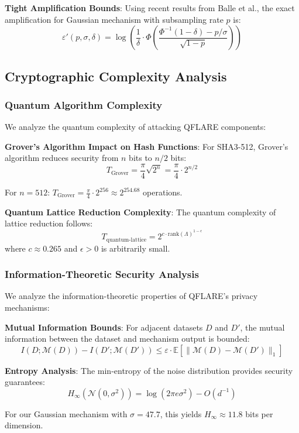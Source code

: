 \documentclass[journal]{IEEEtran}
\begin{document}
\textbf{Tight Amplification Bounds}: Using recent results from Balle et al., the exact amplification for Gaussian mechanism with subsampling rate $p$ is:
$$\varepsilon'(p, \sigma, \delta) = \log\left(\frac{1}{\delta} \cdot \Phi\left(\frac{\Phi^{-1}(1-\delta) - p/\sigma}{\sqrt{1-p}}\right)\right)$$

\subsection{Cryptographic Complexity Analysis}

\subsubsection{Quantum Algorithm Complexity}

We analyze the quantum complexity of attacking QFLARE components:

\textbf{Grover's Algorithm Impact on Hash Functions}:
For SHA3-512, Grover's algorithm reduces security from $n$ bits to $n/2$ bits:
$$T_{\text{Grover}} = \frac{\pi}{4}\sqrt{2^n} = \frac{\pi}{4} \cdot 2^{n/2}$$

For $n = 512$: $T_{\text{Grover}} = \frac{\pi}{4} \cdot 2^{256} \approx 2^{254.68}$ operations.

\textbf{Quantum Lattice Reduction Complexity}:
The quantum complexity of lattice reduction follows:
$$T_{\text{quantum-lattice}} = 2^{c \cdot \text{rank}(\Lambda)^{1-\epsilon}}$$
where $c \approx 0.265$ and $\epsilon > 0$ is arbitrarily small.

\subsubsection{Information-Theoretic Security Analysis}

We analyze the information-theoretic properties of QFLARE's privacy mechanisms:

\textbf{Mutual Information Bounds}:
For adjacent datasets $D$ and $D'$, the mutual information between the dataset and mechanism output is bounded:
$$I(D; \mathcal{M}(D)) - I(D'; \mathcal{M}(D')) \leq \varepsilon \cdot \mathbb{E}[\|\mathcal{M}(D) - \mathcal{M}(D')\|_1]$$

\textbf{Entropy Analysis}:
The min-entropy of the noise distribution provides security guarantees:
$$H_\infty(\mathcal{N}(0, \sigma^2)) = \log(2\pi e \sigma^2) - O(d^{-1})$$

For our Gaussian mechanism with $\sigma = 47.7$, this yields $H_\infty \approx 11.8$ bits per dimension.
\end{document}
